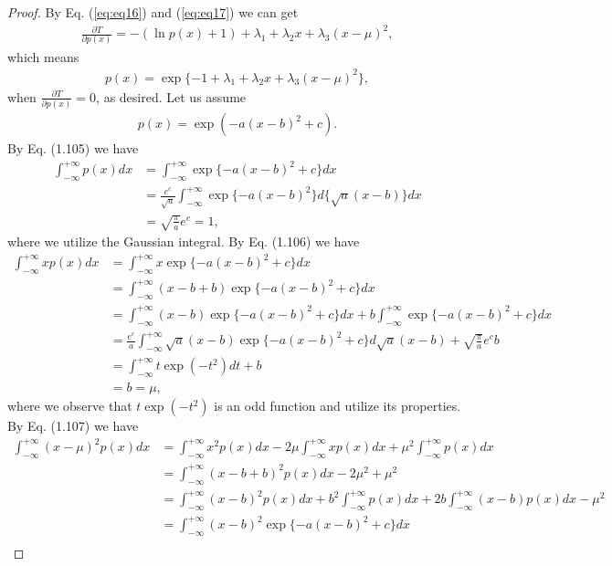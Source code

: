 \documentclass[11pt]{article}
\theoremstyle{definition}
\begin{document}
\begin{proof}
By Eq. (\ref{eq:eq16}) and (\ref{eq:eq17}) we can get 
\begin{align*}
\frac{\partial T}{\partial p(x)} = -(\ln p(x) + 1) + \lambda_1 + \lambda_2 x + \lambda_3 (x-\mu)^2,
\end{align*}
which means
\begin{align*}
p(x) = \exp\{-1 + \lambda_1 + \lambda_2 x + \lambda_3 (x-\mu)^2\},
\end{align*}
when $\frac{\partial T}{\partial p(x)} = 0$, as desired. Let us assume
\begin{align*}
p(x) = \exp(-a(x-b)^2+c).
\end{align*}
By Eq. (1.105) we have
\begin{align}
\int^{+\infty}_{-\infty}p(x)dx &= \int^{+\infty}_{-\infty}\exp\{-a(x-b)^2+c\} dx\nonumber\\
&= \frac{e^c}{\sqrt{a}}\int^{+\infty}_{-\infty}\exp\{-a(x-b)^2\}d\{\sqrt{a}(x-b)\} dx\nonumber\\
&= \sqrt{\frac{\pi}{a}}e^c = 1, \label{eq:eq18}
\end{align}
where we utilize the Gaussian integral. By Eq. (1.106) we have
\begin{align}
\int^{+\infty}_{-\infty}xp(x)dx &= \int^{+\infty}_{-\infty}x\exp\{-a(x-b)^2+c\}dx \nonumber\\
&= \int^{+\infty}_{-\infty}(x-b+b)\exp\{-a(x-b)^2+c\}dx \nonumber\\
&= \int^{+\infty}_{-\infty}(x-b)\exp\{-a(x-b)^2+c\}dx + b\int^{+\infty}_{-\infty}\exp\{-a(x-b)^2+c\}dx \nonumber\\
&= \frac{e^c}{a}\int^{+\infty}_{-\infty}\sqrt{a}(x-b)\exp\{-a(x-b)^2+c\}d\sqrt{a}(x-b) + \sqrt{\frac{\pi}{a}}e^cb \nonumber \\
&= \int^{+\infty}_{-\infty}t\exp(-t^2)dt + b \nonumber \\
&= b = \mu,
\end{align}
where we observe that $t\exp(-t^2)$ is an odd function and utilize its properties. By Eq. (1.107) we have
\begin{align}
\int^{+\infty}_{-\infty}(x-\mu)^2p(x)dx &= \int^{+\infty}_{-\infty}x^2p(x)dx -2\mu\int^{+\infty}_{-\infty}xp(x)dx + \mu^2\int^{+\infty}_{-\infty}p(x)dx \nonumber\\
&= \int^{+\infty}_{-\infty}(x-b+b)^2p(x)dx -2\mu^2 + \mu^2 \nonumber \\
&= \int^{+\infty}_{-\infty}(x-b)^2p(x)dx + b^2\int^{+\infty}_{-\infty}p(x)dx + 2b\int^{+\infty}_{-\infty}(x-b)p(x)dx -\mu^2\nonumber\\
&= \int^{+\infty}_{-\infty}(x-b)^2\exp\{-a(x-b)^2+c\}dx \nonumber \\

\end{align}
\end{proof}
\end{document}
